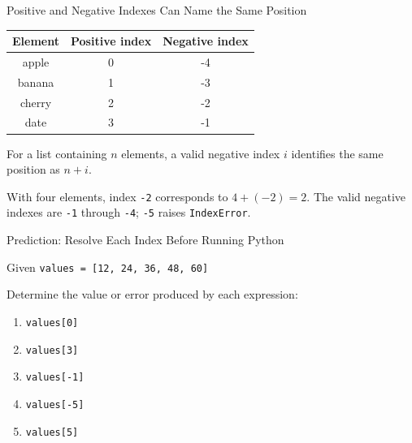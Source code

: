 \documentclass[aspectratio=169,10pt]{beamer}
\begin{document}
\begin{frame}{Positive and Negative Indexes Can Name the Same Position}
  \begin{center}
    \renewcommand{\arraystretch}{1.35}
    \begin{tabular}{c|c|c}
      \textbf{Element} & \textbf{Positive index} & \textbf{Negative index} \\\hline
      apple & 0 & -4 \\
      banana & 1 & -3 \\
      cherry & 2 & -2 \\
      date & 3 & -1
    \end{tabular}
  \end{center}

  \begin{keyidea}
    For a list containing \(n\) elements, a valid negative index \(i\) identifies the same position as \(n+i\).
  \end{keyidea}

  \begin{exampleblockcp}
    With four elements, index \texttt{-2} corresponds to \(4 + (-2) = 2\). The valid negative indexes are \texttt{-1} through \texttt{-4}; \texttt{-5} raises \texttt{IndexError}.
  \end{exampleblockcp}
\end{frame}

\begin{frame}{Prediction: Resolve Each Index Before Running Python}
  \begin{block}{Given}
    \centering
    \texttt{values = [12, 24, 36, 48, 60]}
  \end{block}

  \begin{activity}
    Determine the value or error produced by each expression:
    \begin{enumerate}
      \item \texttt{values[0]}
      \item \texttt{values[3]}
      \item \texttt{values[-1]}
      \item \texttt{values[-5]}
      \item \texttt{values[5]}
    \end{enumerate}
  \end{activity}
\end{frame}

\end{document}
